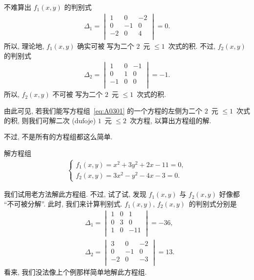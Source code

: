 \begin{example}
    不难算出 \(f_1 (x, y)\) 的判别式
    \begin{align*}
        \Delta_1
        =
        \begin{vmatrix}
            1  & 0  & -2 \\
            0  & -1 & 0  \\
            -2 & 0  & 4  \\
        \end{vmatrix}
        = 0.
    \end{align*}
    所以, 理论地, \(f_1 (x, y)\) 确实可被%
    写为二个 \(2\)~元 \({\leq} 1\)~次式的积.
    不过, \(f_2 (x, y)\) 的判别式
    \begin{align*}
        \Delta_2
        =
        \begin{vmatrix}
            1  & 0 & -1 \\
            0  & 1 & 0  \\
            -1 & 0 & 0  \\
        \end{vmatrix}
        = -1.
    \end{align*}
    所以, \(f_2 (x, y)\) 不可被%
    写为二个 \(2\)~元 \({\leq} 1\)~次式的积.
\end{example}

由此可见, 若我们能写方程组~\eqref{eq:A0301}
的一个方程的左侧为二个 \(2\)~元 \({\leq} 1\)~次式的积,
则我们可解二次 (dufoje) \(1\)~元 \({\leq} 2\)~次方程,
以算出方程组的解.

不过, 不是所有的方程组都这么简单.

\begin{example}\label{emp:A0301}
    解方程组
    \begin{align*}
        \begin{cases}
            f_1 (x, y) = x^2 + 3y^2 + 2x - 11 = 0, \\
            f_2 (x, y) = 3x^2 - y^2 - 4x - 3 = 0.
        \end{cases}
    \end{align*}

    我们试用老方法解此方程组.
    不过, 试了试, 发现
    \(f_1 (x, y)\) 与 \(f_2 (x, y)\)
    好像都 ``不可被分解''.
    此时, 我们来计算判别式.
    \(f_1 (x, y)\), \(f_2 (x, y)\)~的判别式分别是
    \begin{align*}
         & \Delta_1
        =
        \begin{vmatrix}
            1 & 0 & 1   \\
            0 & 3 & 0   \\
            1 & 0 & -11 \\
        \end{vmatrix}
        = -36,
        \\
         & \Delta_2
        =
        \begin{vmatrix}
            3  & 0  & -2 \\
            0  & -1 & 0  \\
            -2 & 0  & -3 \\
        \end{vmatrix}
        = 13.
    \end{align*}
    看来, 我们没法像上个例那样简单地解此方程组.
\end{example}

